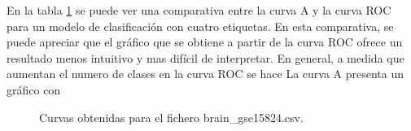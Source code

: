 \bigbreak

En la tabla \ref{fig:2} se puede ver una comparativa entre la curva A y la curva ROC para un modelo de clasificación con cuatro etiquetas. En esta comparativa, se puede apreciar que el gráfico que se obtiene a partir de la curva ROC ofrece un resultado menos intuitivo y mas difícil de interpretar. En general, a medida que aumentan el numero de clases en la curva ROC se hace La curva A presenta un gráfico con  


\bigbreak

\begin{figure}[htp]
    \centering
    \caption{Curvas obtenidas para el fichero brain\_gse15824.csv.}
    \label{fig:2}
\end{figure}

\bigbreak

\clearpage